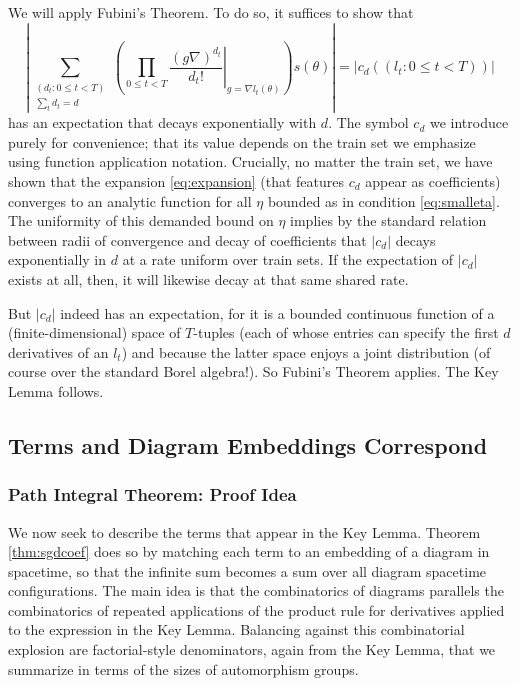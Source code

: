 \documentclass{article}
\theoremstyle{plain}
\theoremstyle{definition}
\newcommand{\wrap}[1]{\left(#1\right)}
\newcommand{\wabs}[1]{\left|#1\right|}
\begin{document}
            We will apply Fubini's Theorem.  To do so, it suffices to show that   
            $$
                \wabs{
                    \sum_{\substack{(d_t: 0\leq t<T) \\ \sum_t d_t = d}}
                    \wrap{
                        \prod_{0 \leq t < T} \left.
                            \frac{(g \nabla)^{d_t}}{d_t!}
                        \right|_{g=\nabla l_t(\theta)}
                    } s (\theta)
                }
                = \wabs{c_d((l_t: 0\leq t<T))} 
            $$
            has an expectation that decays exponentially with $d$.  The symbol
            $c_d$ we introduce purely for convenience; that its value depends
            on the train set we emphasize using function application
            notation.  Crucially, no matter the train set, we have shown
            that the expansion \ref{eq:expansion} (that features $c_d$ appear
            as coefficients) converges to an analytic function for all $\eta$
            bounded as in condition \ref{eq:smalleta}.  The uniformity of this
            demanded bound on $\eta$ implies by the standard relation between
            radii of convergence and decay of coefficients that $\wabs{c_d}$
            decays exponentially in $d$ at a rate uniform over train sets.
            If the expectation of $\wabs{c_d}$ exists at all, then, it will
            likewise decay at that same shared rate.
            
            But $\wabs{c_d}$ indeed has an expectation, for it is a bounded
            continuous function of a (finite-dimensional) space of $T$-tuples
            (each of whose entries can specify the first $d$ derivatives of an
            $l_t$) and because the latter space enjoys a joint distribution (of
            course over the standard Borel algebra!).  So Fubini's Theorem
            applies. The Key Lemma
            follows.   

    \subsection{Terms and Diagram Embeddings Correspond}
        \subsubsection*{Path Integral Theorem: Proof Idea}
            We now seek to describe the terms that appear in the Key Lemma. 
            Theorem \ref{thm:sgdcoef} does so by matching each term to an
            embedding of a diagram in spacetime, so that the infinite sum
            becomes a sum over all diagram spacetime configurations.
            The main idea is that the combinatorics of diagrams parallels the
            combinatorics of repeated applications of the product rule for
            derivatives applied to the expression in the Key Lemma. 
            Balancing against this combinatorial explosion are factorial-style 
            denominators, again from the Key Lemma, that we summarize in terms
            of the sizes of automorphism groups.
\end{document}
